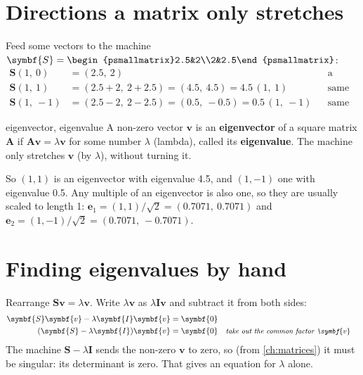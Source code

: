 \documentclass[11pt,a4paper,oneside,openany]{book}
\newcommand{\B}[1]{{\symbf{#1}}}
\newcommand{\B}[1]{{\bm{#1}}}
\newcommand{\ve}{\B{e}}
\newcommand{\vv}{\B{v}}
\newcommand{\mS}{\B{S}}
\newcommand{\mI}{\B{I}}
\newcommand{\mA}{\B{A}}
\newcommand{\why}[1]{&&\text{\small\itshape #1}}
\begin{document}
\section{Directions a matrix only stretches}

Feed some vectors to the machine $\mS=\begin{psmallmatrix}2.5&2\\2&2.5\end{psmallmatrix}$:
\begin{align*}
\mS(1,\ 0) &= (2.5,\ 2) &&\text{a different direction}\\
\mS(1,\ 1) &= (2.5+2,\ 2+2.5)=(4.5,\ 4.5)=4.5\,(1,\ 1) &&\text{same direction, 4.5 times longer}\\
\mS(1,\ -1) &= (2.5-2,\ 2-2.5)=(0.5,\ -0.5)=0.5\,(1,\ -1) &&\text{same direction, half as long}
\end{align*}

\begin{defn}{eigenvector, eigenvalue}
A non-zero vector $\vv$ is an \textbf{eigenvector} of a square matrix $\mA$ if $\mA\vv=\lambda\vv$ for some number
$\lambda$ (lambda), called its \textbf{eigenvalue}. The machine only stretches $\vv$ (by $\lambda$), without turning it.
\end{defn}

So $(1,1)$ is an eigenvector with eigenvalue 4.5, and $(1,-1)$ one with eigenvalue 0.5. Any multiple of an eigenvector is
also one, so they are usually scaled to length 1: $\ve_1=(1,1)/\sqrt2=(0.7071,\ 0.7071)$ and $\ve_2=(1,-1)/\sqrt2=(0.7071,\
-0.7071)$.

\section{Finding eigenvalues by hand}

Rearrange $\mS\vv=\lambda\vv$. Write $\lambda\vv$ as $\lambda\mI\vv$ and subtract it from both sides:
\begin{align*}
\mS\vv-\lambda\mI\vv &= \B0\\
(\mS-\lambda\mI)\vv &= \B0 \why{take out the common factor $\vv$}
\end{align*}
The machine $\mS-\lambda\mI$ sends the non-zero $\vv$ to zero, so (from \cref{ch:matrices}) it must be singular: its
determinant is zero. That gives an equation for $\lambda$ alone.
\end{document}
